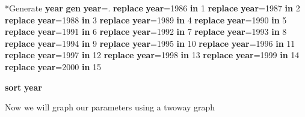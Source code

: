 \documentclass[
]{book}
\newenvironment{Shaded}{\begin{snugshade}}{\end{snugshade}}
\newcommand{\FunctionTok}[1]{\textcolor[rgb]{0.13,0.29,0.53}{\textbf{#1}}}
\newcommand{\KeywordTok}[1]{\textcolor[rgb]{0.13,0.29,0.53}{\textbf{#1}}}
\newcommand{\NormalTok}[1]{#1}
\begin{document}
\begin{Shaded}
\begin{Highlighting}[]
\NormalTok{*Generate }\FunctionTok{year} 
\KeywordTok{gen}     \FunctionTok{year}\NormalTok{=.}
\KeywordTok{replace} \FunctionTok{year}\NormalTok{=1986 }\KeywordTok{in}\NormalTok{ 1}
\KeywordTok{replace} \FunctionTok{year}\NormalTok{=1987 }\KeywordTok{in}\NormalTok{ 2}
\KeywordTok{replace} \FunctionTok{year}\NormalTok{=1988 }\KeywordTok{in}\NormalTok{ 3}
\KeywordTok{replace} \FunctionTok{year}\NormalTok{=1989 }\KeywordTok{in}\NormalTok{ 4}
\KeywordTok{replace} \FunctionTok{year}\NormalTok{=1990 }\KeywordTok{in}\NormalTok{ 5}
\KeywordTok{replace} \FunctionTok{year}\NormalTok{=1991 }\KeywordTok{in}\NormalTok{ 6}
\KeywordTok{replace} \FunctionTok{year}\NormalTok{=1992 }\KeywordTok{in}\NormalTok{ 7}
\KeywordTok{replace} \FunctionTok{year}\NormalTok{=1993 }\KeywordTok{in}\NormalTok{ 8}
\KeywordTok{replace} \FunctionTok{year}\NormalTok{=1994 }\KeywordTok{in}\NormalTok{ 9}
\KeywordTok{replace} \FunctionTok{year}\NormalTok{=1995 }\KeywordTok{in}\NormalTok{ 10}
\KeywordTok{replace} \FunctionTok{year}\NormalTok{=1996 }\KeywordTok{in}\NormalTok{ 11}
\KeywordTok{replace} \FunctionTok{year}\NormalTok{=1997 }\KeywordTok{in}\NormalTok{ 12}
\KeywordTok{replace} \FunctionTok{year}\NormalTok{=1998 }\KeywordTok{in}\NormalTok{ 13}
\KeywordTok{replace} \FunctionTok{year}\NormalTok{=1999 }\KeywordTok{in}\NormalTok{ 14}
\KeywordTok{replace} \FunctionTok{year}\NormalTok{=2000 }\KeywordTok{in}\NormalTok{ 15}

\KeywordTok{sort} \FunctionTok{year}
\end{Highlighting}
\end{Shaded}

Now we will graph our parameters using a twoway graph
\end{document}
